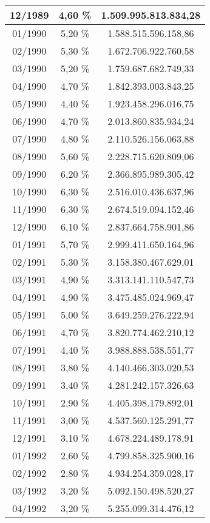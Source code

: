 \begin{center}
\begin{longtable}{|c|c|c|}
12/1989 & 4,60 \% & 1.509.995.813.834,28 \\ \hline
01/1990 & 5,20 \% & 1.588.515.596.158,86 \\ \hline
02/1990 & 5,30 \% & 1.672.706.922.760,58 \\ \hline
03/1990 & 5,20 \% & 1.759.687.682.749,33 \\ \hline
04/1990 & 4,70 \% & 1.842.393.003.843,25 \\ \hline
05/1990 & 4,40 \% & 1.923.458.296.016,75 \\ \hline
06/1990 & 4,70 \% & 2.013.860.835.934,24 \\ \hline
07/1990 & 4,80 \% & 2.110.526.156.063,88 \\ \hline
08/1990 & 5,60 \% & 2.228.715.620.809,06 \\ \hline
09/1990 & 6,20 \% & 2.366.895.989.305,42 \\ \hline
10/1990 & 6,30 \% & 2.516.010.436.637,96 \\ \hline
11/1990 & 6,30 \% & 2.674.519.094.152,46 \\ \hline
12/1990 & 6,10 \% & 2.837.664.758.901,86 \\ \hline
01/1991 & 5,70 \% & 2.999.411.650.164,96 \\ \hline
02/1991 & 5,30 \% & 3.158.380.467.629,01 \\ \hline
03/1991 & 4,90 \% & 3.313.141.110.547,73 \\ \hline
04/1991 & 4,90 \% & 3.475.485.024.969,47 \\ \hline
05/1991 & 5,00 \% & 3.649.259.276.222,94 \\ \hline
06/1991 & 4,70 \% & 3.820.774.462.210,12 \\ \hline
07/1991 & 4,40 \% & 3.988.888.538.551,77 \\ \hline
08/1991 & 3,80 \% & 4.140.466.303.020,53 \\ \hline
09/1991 & 3,40 \% & 4.281.242.157.326,63 \\ \hline
10/1991 & 2,90 \% & 4.405.398.179.892,01 \\ \hline
11/1991 & 3,00 \% & 4.537.560.125.291,77 \\ \hline
12/1991 & 3,10 \% & 4.678.224.489.178,91 \\ \hline
01/1992 & 2,60 \% & 4.799.858.325.900,16 \\ \hline
02/1992 & 2,80 \% & 4.934.254.359.028,17 \\ \hline
03/1992 & 3,20 \% & 5.092.150.498.520,27 \\ \hline
04/1992 & 3,20 \% & 5.255.099.314.476,12 \\ \hline

\end{longtable}
\end{center}
